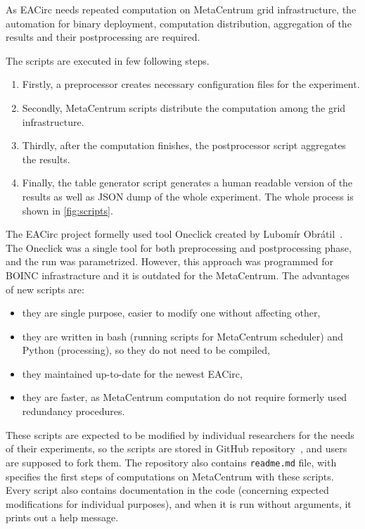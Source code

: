 \documentclass[
    digital,    %
    oneside,    %
    color,
    11pt,
    nocover,
    notable,
    nolof,
    nolot,
]{fithesis3}
\begin{document}
As EACirc needs repeated computation on MetaCentrum grid infrastructure, the automation for binary deployment, computation distribution, aggregation of the results and their postprocessing are required.

The scripts are executed in few following steps.

\begin{enumerate}[noitemsep,topsep=3pt,parsep=3pt,partopsep=3pt]
 \item Firstly, a preprocessor creates necessary configuration files for the experiment.
 \item Secondly, MetaCentrum scripts distribute the computation among the grid infrastructure.
 \item Thirdly, after the computation finishes, the postprocessor script aggregates the results. 
 \item Finally, the table generator script generates a human readable version of the results as well as \textsc{JSON} dump of the whole experiment. The whole process is shown in \cref{fig:scripts}.
\end{enumerate}

The EACirc project formelly used tool Oneclick created by Lubomír Obrátil~\cite{obratilBcThesis}. The Oneclick was a single tool for both preprocessing and postprocessing phase, and the run was parametrized. However, this approach was programmed for BOINC infrastracture and it is outdated for the MetaCentrum. The advantages of new scripts are: 

\begin{itemize}
    \item they are single purpose, easier to modify one without affecting other,
    \item they are written in bash (running scripts for MetaCentrum scheduler) and Python (processing), so they do not need to be compiled,
    \item they maintained up-to-date for the newest EACirc,
    \item they are faster, as MetaCentrum computation do not require formerly used redundancy procedures.
\end{itemize}

These scripts are expected to be modified by individual researchers for the needs of their experiments, so the scripts are stored in GitHub repository~\cite{eaUtils}, and users are supposed to fork them. The repository also contains \texttt{readme.md} file, with specifies the first steps of computations on MetaCentrum with these scripts. Every script also contains documentation in the code (concerning expected modifications for individual purposes), and when it is run without arguments, it prints out a help message.
\end{document}
